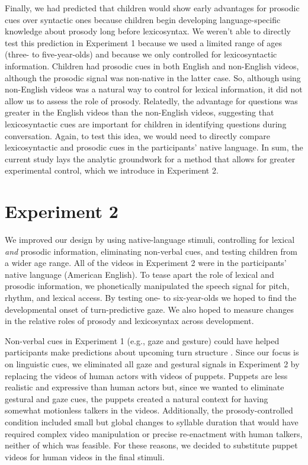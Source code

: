 \documentclass[authoryear, 12pt]{elsarticle}
\begin{document}
Finally, we had predicted that children would show early advantages for prosodic cues over syntactic ones because children begin developing language-specific knowledge about prosody long before lexicosyntax. We weren't able to directly test this prediction in Experiment 1 because we used a limited range of ages (three- to five-year-olds) and because we only controlled for lexicosyntactic information. Children had prosodic cues in both English and non-English videos, although the prosodic signal was non-native in the latter case. So, although using non-English videos was a natural way to control for lexical information, it did not allow us to assess the role of prosody. Relatedly, the advantage for questions was greater in the English videos than the non-English videos, suggesting that lexicosyntactic cues are important for children in identifying questions during conversation. Again, to test this idea, we would need to directly compare lexicosyntactic and prosodic cues in the participants' native language. In sum, the current study lays the analytic groundwork for a method that allows for greater experimental control, which we introduce in Experiment 2. 




\section{Experiment 2}
\label{sec:exp2}

We improved our design by using native-language stimuli, controlling for lexical \textit{and} prosodic information, eliminating non-verbal cues, and testing children from a wider age range. All of the videos in Experiment 2 were in the participants' native language (American English). To tease apart the role of lexical and prosodic information, we phonetically manipulated the speech signal for pitch, rhythm, and lexical access. By testing one- to six-year-olds we hoped to find the developmental onset of turn-predictive gaze. We also hoped to measure changes in the relative roles of prosody and lexicosyntax across development.

Non-verbal cues in Experiment 1 (e.g., gaze and gesture) could have helped participants make predictions about upcoming turn structure  \citep{rossano2009, stivers2010}. Since our focus is on linguistic cues, we eliminated all gaze and gestural signals in Experiment 2 by replacing the videos of human actors with videos of puppets. Puppets are less realistic and expressive than human actors but, since we wanted to eliminate gestural and gaze cues, the puppets created a natural context for having somewhat motionless talkers in the videos. Additionally, the prosody-controlled condition included small but global changes to syllable duration that would have required complex video manipulation or precise re-enactment with human talkers, neither of which was feasible. For these reasons, we decided to substitute puppet videos for human videos in the final stimuli. 
\end{document}
